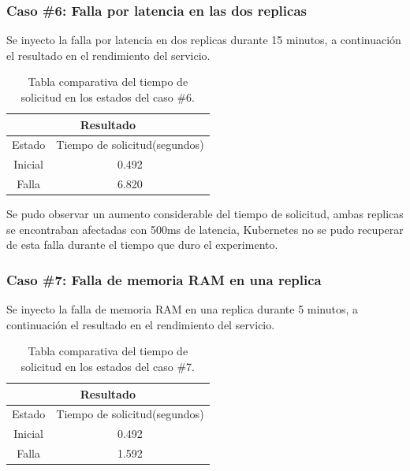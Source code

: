 \subsubsection{Caso \#6: Falla por latencia en las dos replicas}

\par Se inyecto la falla por latencia en dos replicas durante 15 minutos, a continuación el resultado en el rendimiento del servicio.\\

\begin{table}[ht!]
\begin{center}
\begin{tabular}{ |c|c| } 
 \hline
 \multicolumn{2}{|c|}{Resultado} \\
 \hline
 \hline
 Estado & Tiempo de solicitud(segundos)\\
 \hline
 Inicial & 0.492\\
 Falla & 6.820\\
 \hline
\end{tabular}
\end{center}
\caption{Tabla comparativa del tiempo de solicitud en los estados del caso \#6.}
\label{tab:tabla50}
\end{table}

\par Se pudo observar un aumento considerable del tiempo de solicitud, ambas replicas se encontraban afectadas con 500ms de latencia, Kubernetes no se pudo recuperar de esta falla durante el tiempo que duro el experimento.\\

\subsubsection{Caso \#7: Falla de memoria RAM en una replica}

\par Se inyecto la falla de memoria RAM en una replica durante 5 minutos, a continuación el resultado en el rendimiento del servicio.\\

\begin{table}[ht!]
\begin{center}
\begin{tabular}{ |c|c| } 
 \hline
 \multicolumn{2}{|c|}{Resultado} \\
 \hline
 \hline
 Estado & Tiempo de solicitud(segundos)\\
 \hline
 Inicial & 0.492\\
 Falla & 1.592\\
 \hline
\end{tabular}
\end{center}
\caption{Tabla comparativa del tiempo de solicitud en los estados del caso \#7.}
\label{tab:tabla51}
\end{table}

